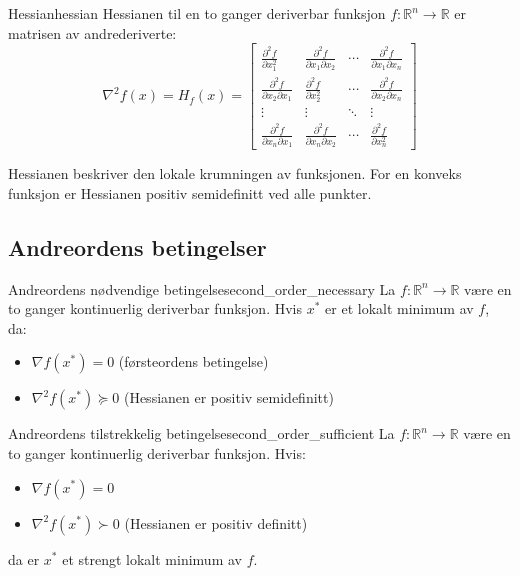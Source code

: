 \begin{definition}{Hessian}{hessian}
	Hessianen til en to ganger deriverbar funksjon $f: \mathbb{R}^n \to \mathbb{R}$ er matrisen av andrederiverte:
	\[
		\nabla^2 f(x) = H_f(x) = \begin{bmatrix}
			\frac{\partial^2 f}{\partial x_1^2}            & \frac{\partial^2 f}{\partial x_1 \partial x_2} & \cdots & \frac{\partial^2 f}{\partial x_1 \partial x_n} \\
			\frac{\partial^2 f}{\partial x_2 \partial x_1} & \frac{\partial^2 f}{\partial x_2^2}            & \cdots & \frac{\partial^2 f}{\partial x_2 \partial x_n} \\
			\vdots                                         & \vdots                                         & \ddots & \vdots                                         \\
			\frac{\partial^2 f}{\partial x_n \partial x_1} & \frac{\partial^2 f}{\partial x_n \partial x_2} & \cdots & \frac{\partial^2 f}{\partial x_n^2}
		\end{bmatrix}
	\]
\end{definition}

Hessianen beskriver den lokale krumningen av funksjonen. For en konveks funksjon er Hessianen positiv semidefinitt ved alle punkter.

\subsection{Andreordens betingelser}

\begin{theorem}{Andreordens nødvendige betingelse}{second_order_necessary}
	La $f: \mathbb{R}^n \to \mathbb{R}$ være en to ganger kontinuerlig deriverbar funksjon. Hvis $x^*$ er et lokalt minimum av $f$, da:
	\begin{itemize}
		\item $\nabla f(x^*) = 0$ (førsteordens betingelse)
		\item $\nabla^2 f(x^*) \succeq 0$ (Hessianen er positiv semidefinitt)
	\end{itemize}
\end{theorem}

\begin{theorem}{Andreordens tilstrekkelig betingelse}{second_order_sufficient}
	La $f: \mathbb{R}^n \to \mathbb{R}$ være en to ganger kontinuerlig deriverbar funksjon. Hvis:
	\begin{itemize}
		\item $\nabla f(x^*) = 0$
		\item $\nabla^2 f(x^*) \succ 0$ (Hessianen er positiv definitt)
	\end{itemize}
	da er $x^*$ et strengt lokalt minimum av $f$.
\end{theorem}

